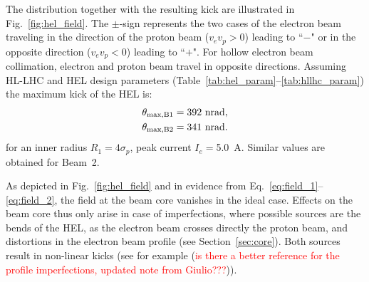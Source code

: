 \documentclass[%
 reprint,
 amsmath,amssymb,
 aps,
prstab,
]{revtex4-1}
\begin{document}
The distribution together with the resulting kick are illustrated in Fig.~\ref{fig:hel_field}. The $\pm$-sign represents the two cases of the electron beam traveling in the direction of the proton beam ($v_e v_p>0$) leading to ``$-$" or in the opposite direction ($v_e v_p<0$) leading to ``$+$". For hollow electron beam collimation, electron and proton beam travel in opposite directions. Assuming HL-LHC and HEL design parameters (Table~\ref{tab:hel_param}--\ref{tab:hllhc_param}) the maximum kick of the HEL is:
\begin{eqnarray}
\theta_{\rm max,B1} = 392~\rm{nrad},\\
\theta_{\rm max,B2} = 341~\rm{nrad}.
\end{eqnarray}
for an inner radius $R_1=4\sigma_p$, peak current $I_e=$\SI{5.0}{A}. Similar values are obtained for Beam~2.

As depicted in Fig.~\ref{fig:hel_field} and in evidence from Eq.~\ref{eq:field_1}--\ref{eq:field_2}, the field at the beam core vanishes in the ideal case. Effects on the beam core thus only arise in case of imperfections, where possible sources are the bends of the HEL, as the electron beam crosses directly the proton beam, and distortions in the electron beam profile (see Section~\ref{sec:core}). Both sources result in non-linear kicks (see for example \cite{hel_bends_stancari,hel_model_polynomial_morozov} (\textcolor{red}{is there a better reference for the profile imperfections, updated note from Giulio???})).
\end{document}
